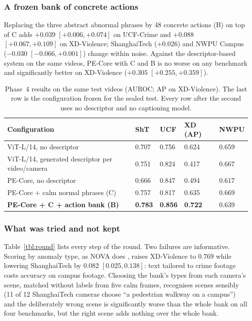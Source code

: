 \documentclass[a4paper,fleqn]{cas-sc}
\begin{document}
\subsubsection{A frozen bank of concrete actions}
Replacing the three abstract abnormal phrases by 48 concrete actions (B) on top of
C adds $+0.039$ $[+0.006, +0.074]$ on UCF-Crime and $+0.088$ $[+0.067, +0.109]$ on
XD-Violence; ShanghaiTech ($+0.026$) and NWPU Campus ($-0.030$
$[-0.066, +0.001]$) change within noise. Against the descriptor-based system on
the same videos, PE-Core with C and B is no worse on any benchmark and
significantly better on XD-Violence ($+0.305$ $[+0.255, +0.359]$).

\begin{table}[width=\linewidth,cols=5,pos=h]
\caption{Phase~4 results on the same test videos (AUROC; AP on XD-Violence). The
last row is the configuration frozen for the sealed test. Every row after the
second uses no descriptor and no captioning model.}\label{tbl:phase4}
\begin{tabularx}{\linewidth}{@{}Z l l l l@{}}
\toprule
\textbf{Configuration} & \textbf{ShT} & \textbf{UCF} & \textbf{XD (AP)} & \textbf{NWPU} \\
\midrule
ViT-L/14, no descriptor                         & 0.707 & 0.756 & 0.624 & 0.659 \\
ViT-L/14, generated descriptor per video/camera & 0.751 & 0.824 & 0.417 & 0.667 \\
PE-Core, no descriptor                          & 0.666 & 0.847 & 0.494 & 0.617 \\
PE-Core + calm normal phrases (C)               & 0.757 & 0.817 & 0.635 & 0.669 \\
\textbf{PE-Core + C + action bank (B)}          & \textbf{0.783} & \textbf{0.856} & \textbf{0.722} & 0.639 \\
\bottomrule
\end{tabularx}
\end{table}

\subsubsection{What was tried and not kept}
Table~\ref{tbl:round} lists every step of the round. Two failures are informative.
Scoring by anomaly type, as NOVA does \citep{yin2026nova}, raises XD-Violence to
$0.769$ while lowering ShanghaiTech by $0.082$ $[0.025, 0.138]$: text tailored to
crime footage costs accuracy on campus footage. Choosing the bank's types from each
camera's scene, matched without labels from five calm frames, recognises scenes
sensibly (11 of 12 ShanghaiTech cameras choose ``a pedestrian walkway on a
campus'') and the deliberately wrong scene is significantly worse than the whole
bank on all four benchmarks, but the right scene adds nothing over the whole bank.
\end{document}
